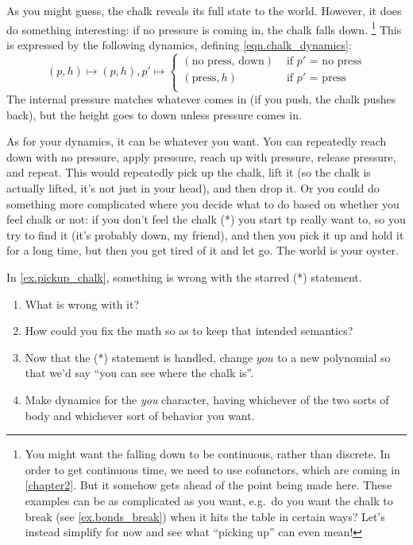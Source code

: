\documentclass[Book-Poly]{subfiles}
\begin{document}
\begin{example}
As you might guess, the chalk reveals its full state to the world. However, it does do something interesting: if no pressure is coming in, the chalk falls down.%
\footnote{You might want the falling down to be continuous, rather than discrete. In order to get continuous time, we need to use cofunctors, which are coming in \cref{chapter2}. But it somehow gets ahead of the point being made here. These examples can be as complicated as you want, e.g.\ do you want the chalk to break (see \cref{ex.bonds_break}) when it hits the table in certain ways? Let's instead simplify for now and see what ``picking up'' can even mean!}
This is expressed by the following dynamics, defining \eqref{eqn.chalk_dynamics}:
\[
  (p,h)\mapsto(p,h),p'\mapsto
	\begin{cases}
		(\text{no press, down})&
			\text{ if $p'$ = no press}\\
		(\text{press}, h)&
			\text{ if $p'$ = press}\\
	\end{cases}	
\]
The internal pressure matches whatever comes in (if you push, the chalk pushes back), but the height goes to down unless pressure comes in.

As for your dynamics, it can be whatever you want. You can repeatedly reach down with no pressure, apply pressure, reach up with pressure, release pressure, and repeat. This would repeatedly pick up the chalk, lift it (so the chalk is actually lifted, it's not just in your head), and then drop it. Or you could do something more complicated where you decide what to do based on whether you feel chalk or not: if you don't feel the chalk (*) you start tp really want to, so you try to find it (it's probably down, my friend), and then you pick it up and hold it for a long time, but then you get tired of it and let go. The world is your oyster.
\end{example}

\begin{exercise}
In \cref{ex.pickup_chalk}, something is wrong with the starred (*) statement. 
\begin{enumerate}
	\item What is wrong with it?
	\item How could you fix the math so as to keep that intended semantics?
	\item Now that the (*) statement is handled, change $\textit{you}$ to a new polynomial so that we'd say ``you can see where the chalk is''.
	\item Make dynamics for the \emph{you} character, having whichever of the two sorts of body and whichever sort of behavior you want.
\qedhere
\end{enumerate}
\end{exercise}
\end{document}
